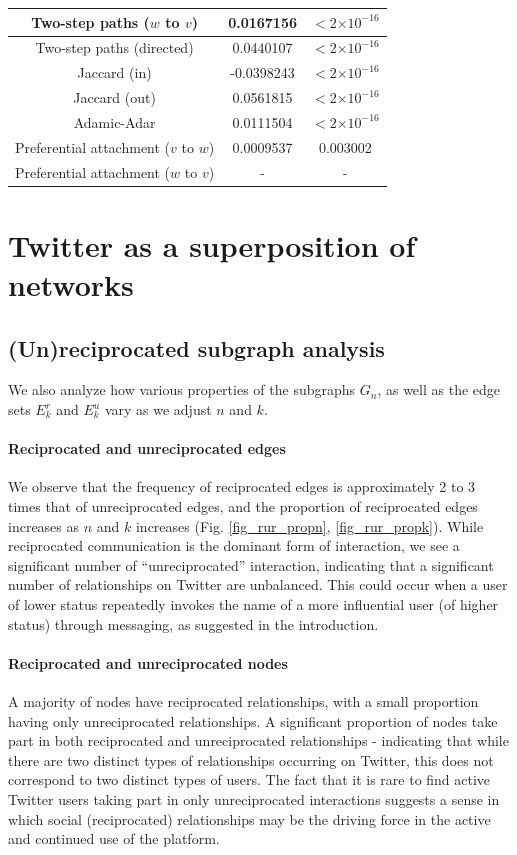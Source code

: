 \documentclass[conference]{IEEEtran}
\providecommand{\e}[1]{\ensuremath{\times 10^{#1}}}
\begin{document}
\begin{table}[!t]
\begin{tabular}{|c||c|c|}
Two-step paths ($w$ to $v$)   &    0.0167156  & $< 2 \e{-16} $\\
\hline
Two-step paths (directed)  &   0.0440107 & $< 2 \e{-16} $\\
Jaccard (in) & -0.0398243 & $< 2 \e{-16} $\\
Jaccard (out) &   0.0561815  & $< 2 \e{-16} $\\
Adamic-Adar  & 0.0111504 & $< 2 \e{-16} $ \\
Preferential attachment ($v$ to $w$) & 0.0009537 & 0.003002 \\
Preferential attachment ($w$ to $v$)  &  - & -  \\
\hline
\end{tabular}
\end{table}

\section{Twitter as a superposition of networks}

\subsection{(Un)reciprocated subgraph analysis}
We also analyze how various properties of the subgraphs $G_n$, as well as the edge sets $E^r_k$ and $E^u_k$ vary as we adjust $n$ and $k$.

\paragraph*{Reciprocated and unreciprocated edges} We observe that the frequency of reciprocated edges is approximately 2 to 3 times that of unreciprocated edges, and the proportion of reciprocated edges increases as $n$ and $k$ increases (Fig. \ref{fig_rur_propn}, \ref{fig_rur_propk}). 
While reciprocated communication is the dominant form of interaction, we see a significant number of ``unreciprocated'' interaction, indicating that a significant number of relationships on Twitter are unbalanced. 
This could occur when a user of lower status repeatedly invokes
the name of a
more influential user (of higher status) through messaging,
as suggested in the introduction.

\paragraph*{Reciprocated and unreciprocated nodes} A majority of nodes have reciprocated relationships, with a small proportion having only unreciprocated relationships. 
A significant proportion of nodes take part in both reciprocated and unreciprocated relationships - indicating that while there are two distinct types of relationships occurring on Twitter, this does not correspond to two distinct types of users. 
The fact that it is rare to find 
active Twitter users taking part in only unreciprocated interactions
suggests a sense in which 
social (reciprocated) relationships may be the 
driving force in the active and continued use of the platform.
\end{document}
